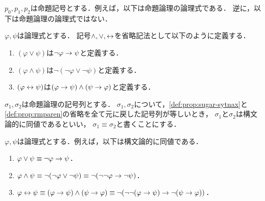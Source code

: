 \begin{myExample}[命題論理の論理式の例]
  $p_0,p_1,p_2$は命題記号とする．例えば，以下は命題論理の論理式である．
  逆に，以下は命題論理の論理式ではない．
\end{myExample}

\begin{myDefinition}
  \label{def:prop:sugar-sytnax}
  $\varphi, \psi$は論理式とする．
  記号$\land, \lor, \leftrightarrow$を省略記法として以下のように定義する．
  \begin{enumerate}
    \item $(\varphi \lor \psi)$は$\lnot\varphi \to \psi$と定義する．
    \item $(\varphi \land \psi)$は$\lnot(\lnot\varphi \lor \lnot\psi)$と定義する．
    \item $(\varphi \leftrightarrow \psi)$は$(\varphi \to \psi) \land (\psi \to \varphi)$と定義する．
  \end{enumerate}
\end{myDefinition}

\begin{myDefinition}[括弧の省略]
  \label{def:prop:rmparen}
\end{myDefinition}

\begin{myDefinition}[構文論的同値]
  $\sigma_1,\sigma_2$は命題論理の記号列とする．
  $\sigma_1,\sigma_2$について，\ref*{def:prop:sugar-sytnax}と\ref*{def:prop:rmparen}の省略を全て元に戻した記号列が等しいとき，
  $\sigma_1$と$\sigma_2$は構文論的に同値であるといい，
  $\sigma_1 \equiv \sigma_2$と書くことにする．
\end{myDefinition}

\begin{myExample}[構文論的同値の例]
  \label{exp:prop:syntax-equiv}
  $\varphi, \psi$は論理式とする．例えば，以下は構文論的に同値である．
  \begin{enumerate}
    \item $\varphi \lor \psi \equiv \lnot\varphi \to \psi$．
    \item $\varphi \land \psi \equiv \lnot(\lnot\varphi \lor \lnot\psi) \equiv \lnot(\lnot\lnot\varphi \to \lnot\psi)$．
    \item $\varphi \leftrightarrow \psi \equiv (\varphi \to \psi) \land (\psi \to \varphi) \equiv \lnot(\lnot\lnot(\varphi \to \psi) \to \lnot(\psi \to \varphi))$．
  \end{enumerate}
\end{myExample}
